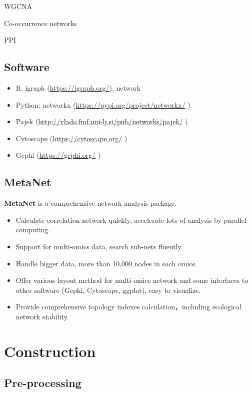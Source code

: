 \documentclass[
]{book}
\begin{document}
WGCNA

Co-occurrence networks

PPI

\hypertarget{software}{%
\section{Software}\label{software}}

\begin{itemize}
\item
  R: igraph (\url{https://igraph.org/}), network
\item
  Python: networkx (\url{https://pypi.org/project/networkx/} )
\item
  Pajek (\url{http://vlado.fmf.uni-lj.si/pub/networks/pajek/} )
\item
  Cytoscape (\url{https://cytoscape.org/} )
\item
  Gephi (\url{https://gephi.org/} )
\end{itemize}

\hypertarget{metanet}{%
\section{MetaNet}\label{metanet}}

\textbf{MetaNet} is a comprehensive network analysis package.

\begin{itemize}
\item
  Calculate correlation network quickly, accelerate lots of analysis
  by parallel computing.
\item
  Support for multi-omics data, search sub-nets fluently.
\item
  Handle bigger data, more than 10,000 nodes in each omics.
\item
  Offer various layout method for multi-omics network and some
  interfaces to other software (Gephi, Cytoscape, ggplot), easy to
  visualize.
\item
  Provide comprehensive topology indexes calculation，including
  ecological network stability.
\end{itemize}

\hypertarget{construction}{%
\chapter{Construction}\label{construction}}

\hypertarget{normalization}{%
\section{Pre-processing}\label{normalization}}
\end{document}
